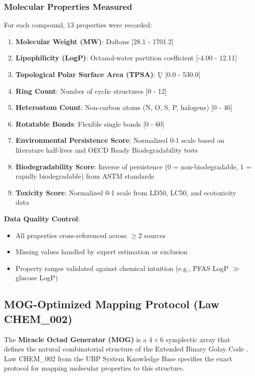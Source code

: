 \documentclass[11pt,letterpaper]{article}
\begin{document}
\subsubsection{Molecular Properties Measured}

For each compound, 13 properties were recorded:

\begin{enumerate}
    \item \textbf{Molecular Weight (MW)}: Daltons [28.1 - 1701.2]
    \item \textbf{Lipophilicity (LogP)}: Octanol-water partition coefficient [-4.00 - 12.11]
    \item \textbf{Topological Polar Surface Area (TPSA)}: Ų [0.0 - 530.0]
    \item \textbf{Ring Count}: Number of cyclic structures [0 - 12]
    \item \textbf{Heteroatom Count}: Non-carbon atoms (N, O, S, P, halogens) [0 - 46]
    \item \textbf{Rotatable Bonds}: Flexible single bonds [0 - 60]
    \item \textbf{Environmental Persistence Score}: Normalized 0-1 scale based on literature half-lives and OECD Ready Biodegradability tests \cite{OECD301}
    \item \textbf{Biodegradability Score}: Inverse of persistence (0 = non-biodegradable, 1 = rapidly biodegradable) from ASTM standards \cite{ASTMD6400}
    \item \textbf{Toxicity Score}: Normalized 0-1 scale from LD50, LC50, and ecotoxicity data
\end{enumerate}

\textbf{Data Quality Control}:
\begin{itemize}
    \item All properties cross-referenced across $\geq$2 sources
    \item Missing values handled by expert estimation or exclusion
    \item Property ranges validated against chemical intuition (e.g., PFAS LogP $\gg$ glucose LogP)
\end{itemize}

\subsection{MOG-Optimized Mapping Protocol (Law CHEM\_002)}

The \textbf{Miracle Octad Generator (MOG)} is a $4\times6$ symplectic array that defines the natural combinatorial structure of the Extended Binary Golay Code \cite{Curtis1976MOG}. Law CHEM\_002 from the UBP System Knowledge Base specifies the exact protocol for mapping molecular properties to this structure.
\end{document}
